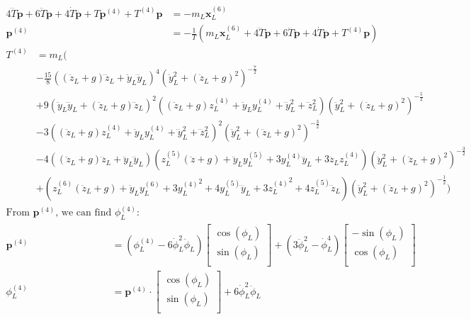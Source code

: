 \documentclass[11pt]{article}
\begin{document}
\begin{align*}
4 \dddot{T} \mathbf{\dot{p}} + 6 \ddot{T} \mathbf{\ddot{p}} + 4 \dot{T} \mathbf{\dddot{p}} + T \mathbf{p}^{(4)} + T^{(4)} \mathbf{p} &= - m_L \mathbf{x}_L^{(6)} \\
\mathbf{{p}}^{(4)} &= - \frac{1}{T} ( m_L \mathbf{x}_L^{(6)} + 4 \dddot{T} \mathbf{\dot{p}} + 6 \ddot{T} \mathbf{\ddot{p}} + 4 \dot{T} \mathbf{\dddot{p}} + T^{(4)} \mathbf{p} ) 
\end{align*}
\begin{align*}
T^{(4)} &= m_L ( \\
& -\frac{15}{8} ( (\ddot{z}_L+g) \dddot{z}_L + \ddot{y}_L \dddot{y}_L) ^4 ( \ddot{y}_L^2 + (\ddot{z}_L+g)^2) ^ {-\frac{7}{2}} \\
& + 9 ( \ddot{y}_L \dddot{y}_L + (\ddot{z}_L+g) \dddot{z}_L) ^2 ( (\ddot{z}_L+g) z_L^{(4)} + \ddot{y}_L y_L^{(4)} + \dddot{y}_L^2 + \dddot{z}_L^2) ( \ddot{y}_L^2 + (\ddot{z}_L+g)^2)^{-\frac{5}{2}} \\
& - 3 ( (\ddot{z}_L+g) z_L^{(4)} + \ddot{y}_L y_L^{(4)} + \dddot{y}_L^2 + \dddot{z}_L^2) ^2 (\ddot{y}_L^2 + (\ddot{z}_L+g)^2)^{-\frac{3}{2}} \\
& - 4 ( (\ddot{z}_L+g) \dddot{z}_L + \ddot{y}_L \dddot{y}_L)( z_L^{(5)}(\ddot{z}+g) + \ddot{y}_L y_L^{(5)} + 3 y_L^{(4)} \dddot{y}_L + 3 \dddot{z}_L z_L^{(4)} ) ( \ddot{y}_L^2 + (\ddot{z}_L+g)^2)^{-\frac{3}{2}} \\
& + ( z_L^{(6)}(\ddot{z}_L+g)+ \ddot{y}_L y_L^{(6)} + 3 {y_L^{(4)}}^2 + 4 y_L^{(5)}\dddot{y}_L + 3 {z_L^{(4)}}^2 + 4 z_L^{(5)}\dddot{z}_L) (\ddot{y}_L^2 + (\ddot{z}_L+g)^2)^{-\frac{1}{2}} ) 
\end{align*}
\begin{align*}
\text{From $\mathbf{p}^{(4)}$, we can find $\phi_L^{(4)}$: } & \\
\mathbf{p}^{(4)}&= (\phi_L^{(4)} - 6 \dot{\phi}_L^2 \ddot{\phi}_L)
\begin{bmatrix}
       \cos(\phi_L) \\
       \sin(\phi_L) \\
\end{bmatrix} 
+ (3 \ddot{\phi}_L^2 - \dot{\phi}_L^4) 
\begin{bmatrix}
       -\sin(\phi_L) \\
       \cos(\phi_L) \\
\end{bmatrix} \\
\phi_L^{(4)} &= \mathbf{p}^{(4)} \cdot 
\begin{bmatrix}
       \cos(\phi_L) \\
       \sin(\phi_L) \\
\end{bmatrix} 
+ 6 \dot{\phi}_L^2 \ddot{\phi}_L 
\end{align*}
\end{document}
